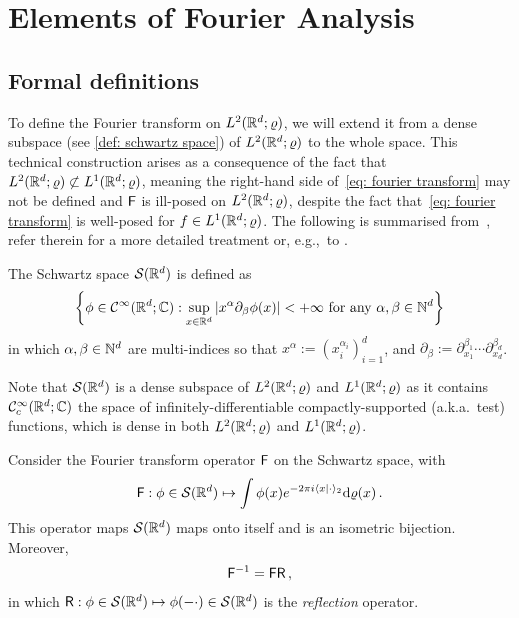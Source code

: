 \section{Elements of Fourier Analysis}\label{app: fourier}

\subsection{Formal definitions}\label{subsec: fourier defs}

To define the Fourier transform on $L^2(\mathbb{R}^d;\varrho)$, we will extend it from a dense subspace (see \cref{def: schwartz space}) of $L^2(\mathbb{R}^d;\varrho)$ to the whole space. This technical construction arises as a consequence of the fact that $L^2(\mathbb{R}^d;\varrho)\not\subset L^1(\mathbb{R}^d;\varrho)$, meaning the right-hand side of~\eqref{eq: fourier transform} may not be defined and $\mathsf{F}$ is ill-posed on $L^2(\mathbb{R}^d;\varrho)$, despite the fact that~\eqref{eq: fourier transform} is well-posed for $f\in L^1(\mathbb{R}^d;\varrho)$. The following is summarised from~\cite[Ch.5--6]{constantin_fourier_2016}, refer therein for a more detailed treatment or, e.g.,\ to \citep{folland_fourier_1992}. 

\begin{definition}\label{def: schwartz space}
    The Schwartz space $\mathcal{S}(\mathbb{R}^d)$ is defined as 
    \[ 
        \left\{\phi\in\mathcal{C}^\infty(\mathbb{R}^d;\mathbb{C}) : \sup_{x\in\mathbb{R}^d}\left\lvert x^\alpha\partial_\beta\phi(x) \right\rvert<+\infty \mbox{ for any } \alpha,\beta\in\mathbb{N}^d\right\}
    \]
    in which $\alpha,\beta\in\mathbb{N}^d$ are multi-indices so that $x^{\alpha}:={(x_i^{\alpha_i})}_{i=1}^d$, and $\partial_\beta:=\partial_{x_1}^{\beta_1}\cdots\partial_{x_d}^{\beta_d}$.
\end{definition}

Note that $\mathcal{S}(\mathbb{R}^d)$ is a dense subspace of $L^2(\mathbb{R}^d;\varrho)$ and $L^1(\mathbb{R}^d;\varrho)$ as it contains $\mathcal{C}^\infty_c(\mathbb{R}^d;\mathbb{C})$ the space of infinitely-differentiable compactly-supported (a.k.a.\ test) functions, which is dense in both $L^2(\mathbb{R}^d;\varrho)$ and  $L^1(\mathbb{R}^d;\varrho)$.

\begin{theorem}\label{thm: constantin def fourier on Schwartz}
    Consider the Fourier transform operator  $\mathsf{F}$ on the Schwartz space, with 
    \begin{align}
        \mathsf{F}: \phi\in\mathcal{S}(\mathbb{R}^d)\mapsto\int \phi(x)e^{-2\pi i\langle x\vert \cdot\rangle_2}\mathrm{d}\varrho(x)\,.\label{eq: fourier transform}
    \end{align}
    This operator maps $\mathcal{S}(\mathbb{R}^d)$ maps onto itself and is an isometric bijection. Moreover, 
    \begin{align}
        \mathsf{F}^{-1}=\mathsf{F}\mathsf{R}\,,\label{eq: inverse fourier (formal operator notation)}
    \end{align}    
    in which $\mathsf{R}:\phi\in\mathcal{S}(\mathbb{R}^d)\mapsto \phi(-\cdot)\in\mathcal{S}(\mathbb{R}^d)$ is the \emph{reflection} operator.
\end{theorem}

